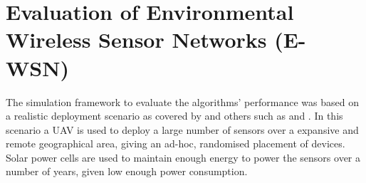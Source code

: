 \section{Evaluation of Environmental Wireless Sensor Networks (E-WSN)}
\label{section:experimental}	
The simulation framework to evaluate the algorithms' performance was based on a realistic deployment scenario as covered by  \cite{Gomez2015} and others such as \cite{Jha2016} and \cite{Avram}. In this scenario a UAV is used to deploy a large number of sensors over a expansive and remote geographical area, giving an ad-hoc, randomised placement of devices. Solar power cells are used to maintain enough energy to power the sensors over a number of years, given low enough power consumption.

